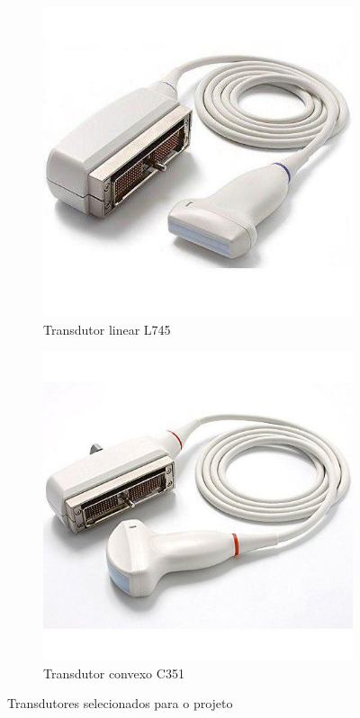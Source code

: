 \begin{figure}[H]
\centering
\begin{subfigure}{.5\textwidth}
  \centering
  \includegraphics[width=.8\linewidth]{figuras/sonoscape-linear-array-transducer-l745_grande.jpg}
  \caption{Transdutor linear L745}
  \label{des_fig20}
\end{subfigure}%
\begin{subfigure}{.5\textwidth}
  \centering
  \includegraphics[width=.8\linewidth]{figuras/sonoscape-convex-array-transducer-c351_grande.jpg}
  \caption{Transdutor convexo C351}
  \label{des_fig21}
\end{subfigure}
\caption{Transdutores selecionados para o projeto}
\label{comb_2fig}
\end{figure}

